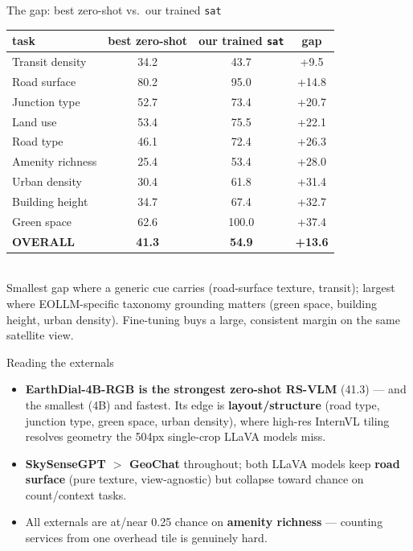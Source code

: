 \documentclass[aspectratio=169]{beamer}
\begin{document}
\begin{frame}{The gap: best zero-shot vs.\ our trained \texttt{sat}}
\centering\footnotesize
\begin{tabular}{lccc}
\toprule
task & best zero-shot & our trained \texttt{sat} & \textbf{gap} \\
\midrule
Transit density  & 34.2 & 43.7 & \textcolor{good}{+9.5} \\
Road surface     & 80.2 & 95.0 & \textcolor{good}{+14.8} \\
Junction type    & 52.7 & 73.4 & \textcolor{good}{+20.7} \\
Land use         & 53.4 & 75.5 & \textcolor{good}{+22.1} \\
Road type        & 46.1 & 72.4 & \textcolor{good}{+26.3} \\
Amenity richness & 25.4 & 53.4 & \textcolor{good}{+28.0} \\
Urban density    & 30.4 & 61.8 & \textcolor{good}{+31.4} \\
Building height  & 34.7 & 67.4 & \textcolor{good}{+32.7} \\
Green space      & 62.6 & 100.0 & \textcolor{good}{+37.4} \\
\midrule
\textbf{OVERALL} & \textbf{41.3} & \textbf{54.9} & \textcolor{good}{\textbf{+13.6}} \\
\bottomrule
\end{tabular}\\[6pt]
\footnotesize Smallest gap where a generic cue carries (road-surface texture, transit);
largest where EOLLM-specific taxonomy grounding matters (green space, building height,
urban density). Fine-tuning buys a large, consistent margin on the same satellite view.
\end{frame}

\begin{frame}{Reading the externals}
\small
\begin{itemize}
\item \textbf{EarthDial-4B-RGB is the strongest zero-shot RS-VLM} (41.3) --- and the
  smallest (4B) and fastest. Its edge is \textbf{layout/structure} (road type, junction
  type, green space, urban density), where high-res InternVL tiling resolves geometry the
  504px single-crop LLaVA models miss.
\item \textbf{SkySenseGPT $>$ GeoChat} throughout; both LLaVA models keep \textbf{road
  surface} (pure texture, view-agnostic) but collapse toward chance on count/context tasks.
\item All externals are at/near 0.25 chance on \textbf{amenity richness} --- counting
  services from one overhead tile is genuinely hard.
\end{itemize}
\end{frame}
\end{document}
